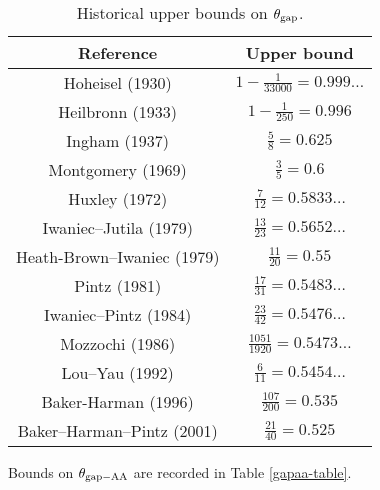 \begin{table}[ht]
    \caption{Historical upper bounds on $\theta_{\mathrm{gap}}$.}
    \centering
    \renewcommand{\arraystretch}{1.2}
    \begin{tabular}{|c|c|}
    \hline
    Reference & Upper bound \\
    \hline
    Hoheisel (1930) \cite{hoheisel_1930} & $1 - \frac{1}{33000} = 0.999\dots$ \\
    \hline
    Heilbronn (1933) \cite{heilbronn_1933} & $1 - \frac{1}{250} = 0.996$ \\
    \hline
    Ingham (1937) \cite{ingham_difference_1937} & $\frac{5}{8} = 0.625$ \\
    \hline
    Montgomery (1969) \cite{montgomery_1969} & $\frac{3}{5} = 0.6$ \\
    \hline
    Huxley (1972) \cite{Huxley} & $\frac{7}{12} = 0.5833\dots$ \\
    \hline
    Iwaniec--Jutila (1979)\cite{iwaniec-jutila} & $\frac{13}{23} = 0.5652\dots$ \\
    \hline
    Heath-Brown--Iwaniec (1979) \cite{heathbrown_iwaniec_1979} & $\frac{11}{20} = 0.55$ \\
    \hline
    Pintz (1981) \cite{pintz_1981} & $\frac{17}{31} = 0.5483\dots$ \\
    \hline
    Iwaniec--Pintz (1984) \cite{iwaniec-pintz} & $\frac{23}{42} = 0.5476\dots$\\
    \hline
    Mozzochi (1986) \cite{mozzochi-consecutive} & $\frac{1051}{1920} = 0.5473\dots$ \\
    \hline
    Lou--Yau (1992) \cite{lou-yao-chebychev} & $\frac{6}{11} = 0.5454\dots$\\
    \hline
    Baker-Harman (1996) \cite{baker-harman} & $\frac{107}{200} = 0.535$\\
    \hline
    Baker--Harman--Pintz (2001) \cite{baker-harman-pintz} & $\frac{21}{40} = 0.525$ \\
    \hline
    \end{tabular}
    \end{table}\label{gapmax-table}

Bounds on $\theta_{\mathrm{gap-AA}}$ are recorded in Table \ref{gapaa-table}.

